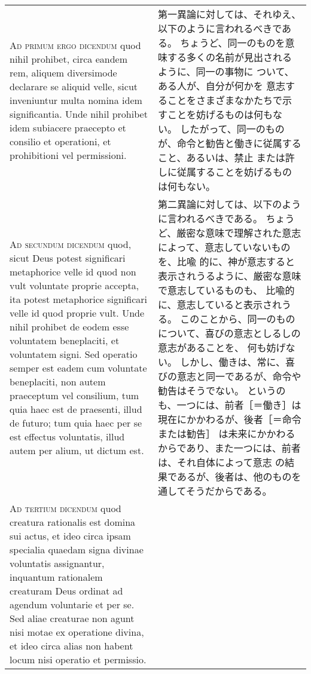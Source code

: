 \documentclass[10pt]{jsarticle} %
\begin{document}
\begin{longtable}{p{21em}p{21em}}
\\


{\scshape Ad primum ergo dicendum} quod nihil prohibet,
circa eandem rem, aliquem diversimode declarare se aliquid velle, sicut
inveniuntur multa nomina idem significantia. Unde nihil prohibet idem
subiacere praecepto et consilio et operationi, et prohibitioni vel
permissioni.


&

第一異論に対しては、それゆえ、以下のように言われるべきである。
ちょうど、同一のものを意味する多くの名前が見出されるように、同一の事物に
 ついて、ある人が、自分が何かを
 意志することをさまざまなかたちで示すことを妨げるものは何もない。
したがって、同一のものが、命令と勧告と働きに従属すること、あるいは、禁止
 または許しに従属することを妨げるものは何もない。


\\


{\scshape Ad secundum dicendum} quod, sicut Deus potest
significari metaphorice velle id quod non vult voluntate proprie
accepta, ita potest metaphorice significari velle id quod proprie
vult. Unde nihil prohibet de eodem esse voluntatem beneplaciti, et
voluntatem signi. Sed operatio semper est eadem cum voluntate
beneplaciti, non autem praeceptum vel consilium, tum quia haec est de
praesenti, illud de futuro; tum quia haec per se est effectus
voluntatis, illud autem per alium, ut dictum est.


&

第二異論に対しては、以下のように言われるべきである。
ちょうど、厳密な意味で理解された意志によって、意志していないものを、比喩
 的に、神が意志すると表示されうるように、厳密な意味で意志しているものも、
 比喩的に、意志していると表示されうる。
このことから、同一のものについて、喜びの意志としるしの意志があることを、
 何も妨げない。
しかし、働きは、常に、喜びの意志と同一であるが、命令や勧告はそうでない。
 というのも、一つには、前者［＝働き］は現在にかかわるが、後者［＝命令または勧告］
 は未来にかかわるからであり、また一つには、前者は、それ自体によって意志
 の結果であるが、後者は、他のものを通してそうだからである。


\\


{\scshape Ad tertium dicendum} quod creatura rationalis
est domina sui actus, et ideo circa ipsam specialia quaedam signa
divinae voluntatis assignantur, inquantum rationalem creaturam Deus
ordinat ad agendum voluntarie et per se. Sed aliae creaturae non agunt
nisi motae ex operatione divina, et ideo circa alias non habent locum
nisi operatio et permissio.


\end{longtable}
\end{document}
